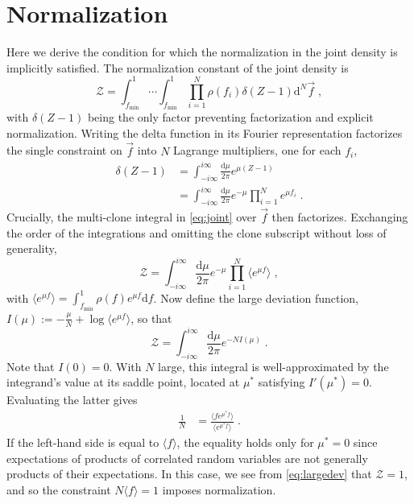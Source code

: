 \documentclass[letterpaper,english,prl,reprint,longbibliography]{revtex4-1} %
\begin{document}
\section{Normalization}\label{sec:normal}
Here we derive the condition for which the normalization in the joint density is implicitly satisfied. The normalization constant of the joint density is
\begin{equation}
	\mathcal{Z}=\int_{f_\textrm{min}}^1\cdots\int_{f_\textrm{min}}^1\prod_{i=1}^N \rho(f_i)\delta(Z-1)\textrm{d}^N\vec{f} \;\label{eq:joint},
\end{equation}
with $\delta(Z-1)$ being the only factor preventing factorization and explicit normalization. Writing the delta function in its Fourier representation factorizes the single constraint on $\vec{f}$ into $N$ Lagrange multipliers, one for each $f_i$,
\begin{align}
	\delta(Z-1)&=\int_{-i\infty}^{i\infty} \frac{\textrm{d} \mu}{2 \pi}e^{\mu(Z-1)}  \\
	&=\int_{-i\infty}^{i\infty} \frac{\textrm{d} \mu}{2 \pi}e^{-\mu}\prod_{i=1}^N e^{\mu f_i} \;.
\end{align}
Crucially, the multi-clone integral in \cref{eq:joint} over $\vec{f}$ then factorizes. Exchanging the order of the integrations and omitting the clone subscript without loss of generality,
\begin{equation}
	\mathcal{Z}=\int_{-i\infty}^{i\infty} \frac{\textrm{d} \mu}{2 \pi} e^{-\mu} \prod_{i=1}^N \langle e^{\mu f}\rangle\;,\label{eq:bigZ}
\end{equation}
with $\langle e^{\mu f}\rangle=\int_{f_\textrm{min}}^1\rho(f)e^{\mu f}\textrm{d}f$. Now define the large deviation function, $I(\mu):=-\frac{\mu}{N}+\log \langle e^{\mu f}\rangle$, so that 
\begin{equation}
	\mathcal{Z}=\int_{-i\infty}^{i\infty} \frac{\textrm{d} \mu}{2 \pi} e^{-N I(\mu)}\;.\label{eq:largedev}
\end{equation}
Note that $I(0)=0$. With $N$ large, this integral is well-approximated by the integrand's value at its saddle point, located at $\mu^*$ satisfying $I'(\mu^*)=0$.  Evaluating the latter gives
\begin{align}
	\frac{1}{N}&=\frac{\langle f e^{\mu^* f}\rangle}{\langle e^{\mu^* f}\rangle}\;.
\end{align} 
If the left-hand side is equal to $\langle f\rangle$, the equality holds only for $\mu^*=0$ since expectations of products of correlated random variables are not generally products of their expectations. 
In this case, we see from \cref{eq:largedev} that $\mathcal{Z}=1$, and so the constraint $N\langle f\rangle=1$ imposes normalization.
\end{document}
